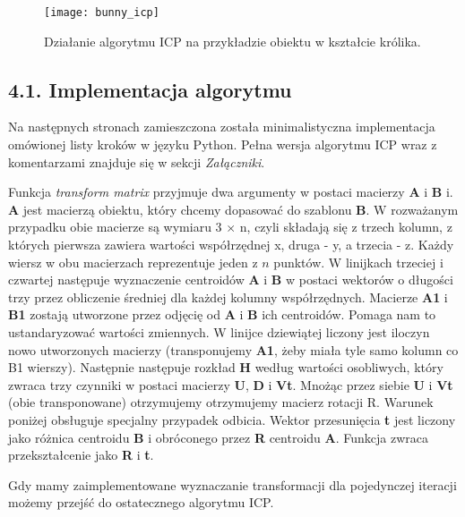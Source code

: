 \documentclass{article}
\begin{document}
\begin{figure}[h!]
\centering
\texttt{[image: bunny\_icp]}
\caption{Działanie algorytmu ICP na przykładzie obiektu w kształcie królika.}
\end{figure}

\newpage
\subsection*{\LARGE{4.1. Implementacja algorytmu}} 
Na następnych stronach zamieszczona została minimalistyczna implementacja omówionej listy kroków w języku Python. Pełna wersja algorytmu ICP wraz z komentarzami znajduje się w sekcji \emph{Załączniki}.

\newpage

\vspace{5mm}

Funkcja \emph{transform matrix} przyjmuje dwa argumenty w postaci macierzy \textbf{A} i \textbf{B} i. \textbf{A} jest macierzą obiektu, który chcemy dopasować do szablonu \textbf{B}. W rozważanym przypadku obie macierze są wymiaru 3 $\times$ n, czyli składają się z trzech kolumn, z których pierwsza zawiera wartości współrzędnej x, druga - y, a trzecia - z. Każdy wiersz w obu macierzach reprezentuje jeden z $n$ punktów. W linijkach trzeciej i czwartej następuje wyznaczenie centroidów \textbf{A} i \textbf{B} w postaci wektorów o długości trzy przez obliczenie średniej dla każdej kolumny współrzędnych. Macierze \textbf{A1} i \textbf{B1} zostają utworzone przez odjęcię od \textbf{A} i \textbf{B} ich centroidów. Pomaga nam to ustandaryzować wartości zmiennych. W linijce dziewiątej liczony jest iloczyn nowo utworzonych macierzy (transponujemy \textbf{A1}, żeby miała tyle samo kolumn co B1 wierszy). Następnie następuje rozkład \textbf{H} według wartości osobliwych, który zwraca trzy czynniki w postaci macierzy \textbf{U}, \textbf{D} i \textbf{Vt}. Mnożąc przez siebie \textbf{U} i \textbf{Vt} (obie transponowane) otrzymujemy otrzymujemy macierz rotacji R. Warunek poniżej obsługuje specjalny przypadek odbicia. Wektor przesunięcia \textbf{t} jest liczony jako różnica centroidu \textbf{B} i obróconego przez \textbf{R} centroidu \textbf{A}. Funkcja zwraca przekształcenie jako \textbf{R} i \textbf{t}.

Gdy mamy zaimplementowane wyznaczanie transformacji dla pojedynczej iteracji możemy przejść do ostatecznego algorytmu ICP.

\vspace{5mm}

\vspace{5mm}
\end{document}
